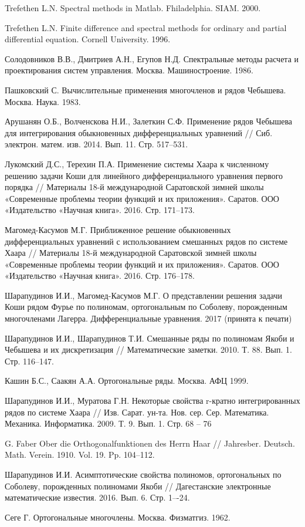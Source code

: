 \begin{thebibliography}{999}
  {Trefethen  L.N.}
Spectral methods in Matlab. Fhiladelphia. SIAM. 2000.

 {Trefethen L.N.}
Finite difference and spectral methods for ordinary and partial differential equation. Cornell University. 1996.

 {Солодовников В.В., Дмитриев А.Н., Егупов Н.Д.}
Спектральные методы расчета и проектирования систем управления. Москва. Машиностроение. 1986.

 {Пашковский С.}
Вычислительные применения многочленов и рядов Чебышева. Москва. Наука. 1983.

 {Арушанян О.Б., Волченскова Н.И., Залеткин С.Ф.}
Применение рядов Чебышева для интегрирования обыкновенных дифференциальных уравнений // Сиб. электрон. матем. изв. 2014. Вып. 11. Стр. 517--531.

 {Лукомский Д.С., Терехин П.А.}
Применение системы Хаара к численному решению задачи Коши для линейного дифференциального уравнения первого порядка // Материалы 18-й международной Саратовской зимней школы «Современные проблемы теории функций и их приложения». Саратов. ООО «Издательство «Научная книга». 2016. Стр. 171--173.

 {Магомед-Касумов М.Г.}
Приближенное решение обыкновенных дифференциальных уравнений с использованием смешанных рядов по системе Хаара // Материалы 18-й международной Саратовской зимней школы «Современные проблемы теории функций и их приложения». Саратов. ООО «Издательство «Научная книга». 2016. Стр. 176--178.

 {Шарапудинов И.И., Магомед-Касумов М.Г.}
О представлении решения задачи Коши  рядом Фурье  по полиномам, ортогональным по  Соболеву, порожденным многочленами Лагерра. Дифференциальные уравнения. 2017 (принята к печати)

 {Шарапудинов И.И., Шарапудинов Т.И.}
Смешанные ряды по полиномам Якоби и Чебышева и их дискретизация // Математические заметки. 2010. Т. 88. Вып. 1. Стр. 116--147.

 {Кашин Б.С., Саакян А.А.}
Ортогональные ряды. Москва. АФЦ 1999.

 {Шарапудинов И.И., Муратова Г.Н.}
Некоторые свойства r-кратно интегрированных рядов по системе Хаара // Изв. Сарат. ун-та. Нов. сер. Сер. Математика. Механика. Информатика. 2009. Т. 9. Вып. 1. Стр. 68 -- 76

 {G. Faber}
Ober die Orthogonalfunktionen des Herrn Haar // Jahresber. Deutsch. Math. Verein. 1910. Vol. 19. Pp. 104--112.

 {Шарапудинов И.И.}
Асимптотические свойства полиномов, ортогональных по Соболеву, порожденных полиномами Якоби // Дагестанские электронные математические известия. 2016. Вып. 6.	Стр. 1–-24.

 {Сеге Г.}
Ортогональные многочлены. Москва. Физматгиз. 1962.
\end{thebibliography}
